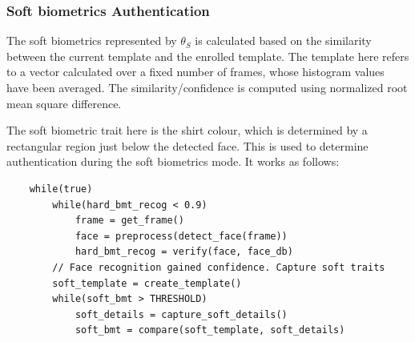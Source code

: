 \documentclass[12pt]{article}			%
\begin{document}
\subsubsection{ Soft biometrics Authentication}

The soft biometrics represented by $\theta_{S}$ is calculated based on the similarity between the current template and the enrolled template.
The template here refers to a vector calculated over a fixed number of frames, whose histogram values have been averaged.
The similarity/confidence is computed using normalized root mean square difference.

The soft biometric trait here is the shirt colour, which is determined by a rectangular region just below the detected face. This is used to determine authentication during the soft biometrics mode. It works as follows:\\[2ex]

\begin{verbatim}
    while(true)
        while(hard_bmt_recog < 0.9)
            frame = get_frame()
            face = preprocess(detect_face(frame))
            hard_bmt_recog = verify(face, face_db)
        // Face recognition gained confidence. Capture soft traits
        soft_template = create_template()
        while(soft_bmt > THRESHOLD)
            soft_details = capture_soft_details()
            soft_bmt = compare(soft_template, soft_details)
\end{verbatim}

\end{document}

